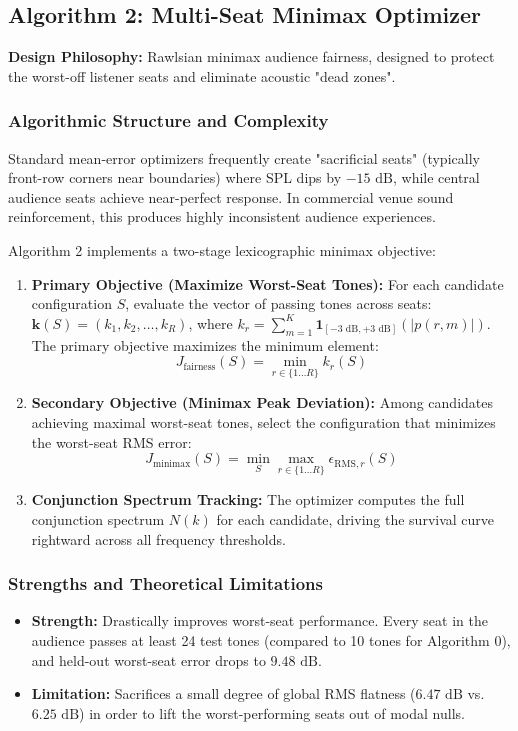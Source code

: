 \documentclass[11pt,a4paper,titlepage]{article}
\begin{document}
\subsection{Algorithm 2: Multi-Seat Minimax Optimizer}
\textbf{Design Philosophy:} Rawlsian minimax audience fairness, designed to protect the worst-off listener seats and eliminate acoustic "dead zones".

\subsubsection{Algorithmic Structure and Complexity}
Standard mean-error optimizers frequently create "sacrificial seats" (typically front-row corners near boundaries) where SPL dips by $-15\text{ dB}$, while central audience seats achieve near-perfect response. In commercial venue sound reinforcement, this produces highly inconsistent audience experiences.

Algorithm 2 implements a two-stage lexicographic minimax objective:
\begin{enumerate}
    \item \textbf{Primary Objective (Maximize Worst-Seat Tones):} For each candidate configuration $S$, evaluate the vector of passing tones across seats: $\mathbf{k}(S) = (k_1, k_2, \dots, k_R)$, where $k_r = \sum_{m=1}^K \mathbf{1}_{[-3\text{ dB}, +3\text{ dB}]}(|p(r, m)|)$. The primary objective maximizes the minimum element:
    \begin{equation}
        J_{\text{fairness}}(S) = \min_{r \in \{1 \dots R\}} k_r(S)
    \end{equation}
    \item \textbf{Secondary Objective (Minimax Peak Deviation):} Among candidates achieving maximal worst-seat tones, select the configuration that minimizes the worst-seat RMS error:
    \begin{equation}
        J_{\text{minimax}}(S) = \min_{S} \max_{r \in \{1 \dots R\}} \epsilon_{\text{RMS}, r}(S)
    \end{equation}
    \item \textbf{Conjunction Spectrum Tracking:} The optimizer computes the full conjunction spectrum $N(k)$ for each candidate, driving the survival curve rightward across all frequency thresholds.
\end{enumerate}

\subsubsection{Strengths and Theoretical Limitations}
\begin{itemize}
    \item \textbf{Strength:} Drastically improves worst-seat performance. Every seat in the audience passes at least 24 test tones (compared to 10 tones for Algorithm 0), and held-out worst-seat error drops to $9.48\text{ dB}$.
    \item \textbf{Limitation:} Sacrifices a small degree of global RMS flatness ($6.47\text{ dB}$ vs. $6.25\text{ dB}$) in order to lift the worst-performing seats out of modal nulls.
\end{itemize}
\end{document}
